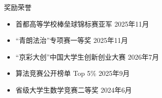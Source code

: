 \documentclass{resume_blue}
\begin{document}
\begin{rSection}{奖励荣誉}
\begin{itemize}
  \item 首都高等学校棒垒球锦标赛亚军 \hfill 2025年11月
  \item “青朗法治”专项赛一等奖      \hfill 2025年11月
  \item “京彩大创”中国大学生创新创业大赛 \hfill 2026年7月
  \item 算法竞赛公开榜单 Top 5\% \hfill 2025年9月
  \item 省级大学生数学竞赛二等奖 \hfill 2024年6月
\end{itemize}
\end{rSection}
\end{document}
